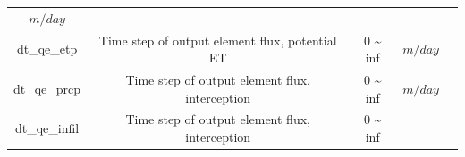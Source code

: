 \documentclass[]{scrbook}
\begin{document}
\begin{longtable}[]{@{}ccccc@{}}
\begin{minipage}[t]{0.10\columnwidth}
\(m/day\)\strut
\end{minipage} & \begin{minipage}[t]{0.26\columnwidth}\centering\strut
\strut
\end{minipage}\tabularnewline
\begin{minipage}[t]{0.17\columnwidth}\centering\strut
dt\_qe\_etp\strut
\end{minipage} & \begin{minipage}[t]{0.23\columnwidth}\centering\strut
Time step of output element flux, potential ET\strut
\end{minipage} & \begin{minipage}[t]{0.10\columnwidth}\centering\strut
0 \textasciitilde{} inf\strut
\end{minipage} & \begin{minipage}[t]{0.10\columnwidth}\centering\strut
\(m/day\)\strut
\end{minipage} & \begin{minipage}[t]{0.26\columnwidth}\centering\strut
\strut
\end{minipage}\tabularnewline
\begin{minipage}[t]{0.17\columnwidth}\centering\strut
dt\_qe\_prcp\strut
\end{minipage} & \begin{minipage}[t]{0.23\columnwidth}\centering\strut
Time step of output element flux, interception\strut
\end{minipage} & \begin{minipage}[t]{0.10\columnwidth}\centering\strut
0 \textasciitilde{} inf\strut
\end{minipage} & \begin{minipage}[t]{0.10\columnwidth}\centering\strut
\(m/day\)\strut
\end{minipage} & \begin{minipage}[t]{0.26\columnwidth}\centering\strut
\strut
\end{minipage}\tabularnewline
\begin{minipage}[t]{0.17\columnwidth}\centering\strut
dt\_qe\_infil\strut
\end{minipage} & \begin{minipage}[t]{0.23\columnwidth}\centering\strut
Time step of output element flux, interception\strut
\end{minipage} & \begin{minipage}[t]{0.10\columnwidth}\centering\strut
0 \textasciitilde{} inf\strut
\end{minipage} & \begin{minipage}[t]{0.10\columnwidth}\centering\strut

\end{minipage}
\end{longtable}
\end{document}
